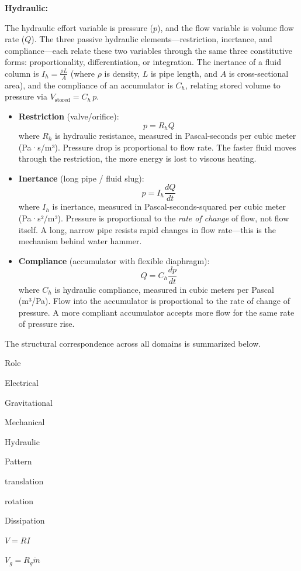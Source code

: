 \documentclass[
  letterpaper,
  DIV=11,
  numbers=noendperiod]{scrartcl}
\begin{document}
\textbf{Hydraulic:}

The hydraulic effort variable is pressure (\(p\)), and the flow variable
is volume flow rate (\(Q\)). The three passive hydraulic
elements---restriction, inertance, and compliance---each relate these
two variables through the same three constitutive forms:
proportionality, differentiation, or integration. The inertance of a
fluid column is \(I_h = \frac{\rho L}{A}\) (where \(\rho\) is density,
\(L\) is pipe length, and \(A\) is cross-sectional area), and the
compliance of an accumulator is \(C_h\), relating stored volume to
pressure via \(V_{\text{stored}} = C_h \, p\).

\begin{itemize}
\item
  \textbf{Restriction} (valve/orifice): \[p = R_h Q\] where \(R_h\) is
  hydraulic resistance, measured in Pascal-seconds per cubic meter
  (Pa·s/m³). Pressure drop is proportional to flow rate. The faster
  fluid moves through the restriction, the more energy is lost to
  viscous heating.
\item
  \textbf{Inertance} (long pipe / fluid slug): \[p = I_h \frac{dQ}{dt}\]
  where \(I_h\) is inertance, measured in Pascal-seconds-squared per
  cubic meter (Pa·s²/m³). Pressure is proportional to the \emph{rate of
  change} of flow, not flow itself. A long, narrow pipe resists rapid
  changes in flow rate---this is the mechanism behind water hammer.
\item
  \textbf{Compliance} (accumulator with flexible diaphragm):
  \[Q = C_h \frac{dp}{dt}\] where \(C_h\) is hydraulic compliance,
  measured in cubic meters per Pascal (m³/Pa). Flow into the accumulator
  is proportional to the rate of change of pressure. A more compliant
  accumulator accepts more flow for the same rate of pressure rise.
\end{itemize}

The structural correspondence across all domains is summarized below.

Role

Electrical

Gravitational

Mechanical

Hydraulic

Pattern

translation

rotation

Dissipation

\(V = RI\)

\(V_g = R_g \dot{m}\)
\end{document}
